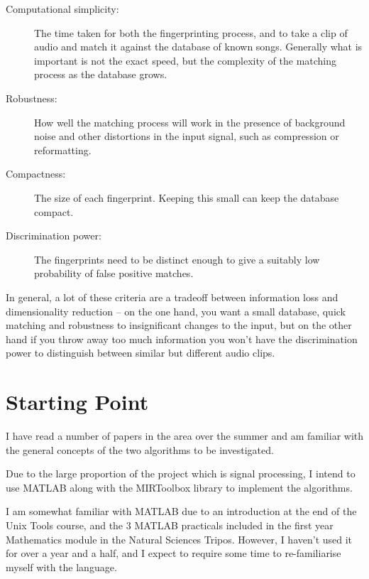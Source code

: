\documentclass[12pt]{article}
\begin{document}
\begin{description}

\item [Computational simplicity:] The time taken for both the fingerprinting process, and to take a clip of audio and match it against the database of known songs. Generally what is important is not the exact speed, but the complexity of the matching process as the database grows.

\item [Robustness:] How well the matching process will work in the presence of background noise and other distortions in the input signal, such as compression or reformatting.

\item [Compactness:] The size of each fingerprint. Keeping this small can keep the database compact.

\item [Discrimination power:] The fingerprints need to be distinct enough to give a suitably low probability of false positive matches.

\end{description}

In general, a lot of these criteria are a tradeoff between information loss and dimensionality reduction -- on the one hand, you want a small database, quick matching and robustness to insignificant changes to the input, but on the other hand if you throw away too much information you won't have the discrimination power to distinguish between similar but different audio clips.


\section*{Starting Point}

I have read a number of papers in the area over the summer and am familiar with the general concepts of the two algorithms to be investigated. 

Due to the large proportion of the project which is signal processing, I intend to use MATLAB along with the MIRToolbox library to implement the algorithms.

I am somewhat familiar with MATLAB due to an introduction at the end of the Unix Tools course, and the 3 MATLAB practicals included in the first year Mathematics module in the Natural Sciences Tripos. However, I haven't used it for over a year and a half, and I expect to require some time to re-familiarise myself with the language.
\end{document}
